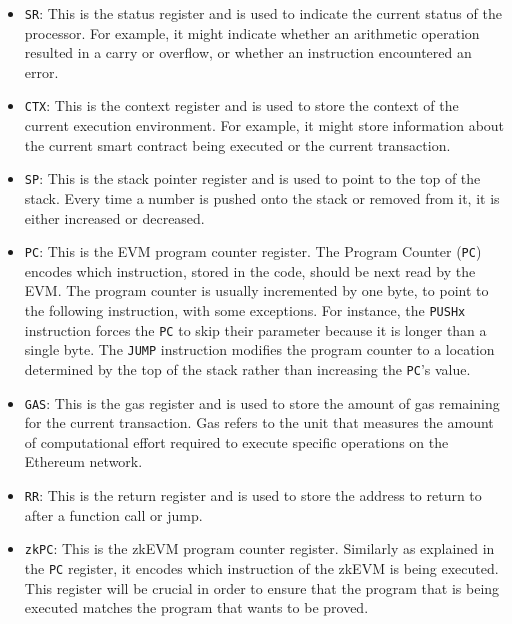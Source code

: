 \begin{itemize}
    
    \item \texttt{SR}: This is the status register and is used to indicate the current status of the processor. For example, it might indicate whether an arithmetic operation resulted in a carry or overflow, or whether an instruction encountered an error.
    
    \item \texttt{CTX}: This is the context register and is used to store the context of the current execution environment. For example, it might store information about the current smart contract being executed or the current transaction.
    
    \item \texttt{SP}: This is the stack pointer register and is used to point to the top of the stack. Every time a number is pushed onto the stack or removed from it, it is either increased or decreased. 
    
    \item \texttt{PC}: This is the EVM program counter register. The Program Counter (\texttt{PC}) encodes which instruction, stored in the code, should be next read by the EVM.  The program counter is usually incremented by one byte, to point to the following instruction, with some exceptions. For instance, the \texttt{PUSHx} instruction forces the \texttt{PC} to skip their parameter because it is longer than a single byte. The \texttt{JUMP} instruction modifies the program counter to a location determined by the top of the stack rather than increasing the \texttt{PC}'s value. 
    
    \item \texttt{GAS}: This is the gas register and is used to store the amount of gas remaining for the current transaction. Gas refers to the unit that measures the amount of computational effort required to execute specific operations on the Ethereum network.
    
    \item \texttt{RR}: This is the return register and is used to store the address to return to after a function call or jump.
    
    \item \texttt{zkPC}: This is the zkEVM program counter register. Similarly as explained in the \texttt{PC} register, it encodes which instruction of the zkEVM is being executed. This register will be crucial in order to ensure that the program that is being executed matches the program that wants to be proved. 
    

\end{itemize}
